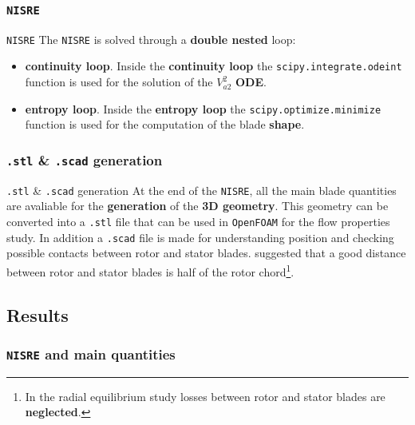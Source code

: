 \subsubsection{\texttt{NISRE}}
	\begin{frame}[fragile]{\texttt{NISRE}}
		The \texttt{NISRE} is solved through a \textbf{double nested} loop:
		\begin{itemize}
			\item \textbf{continuity loop}. Inside the \textbf{continuity loop} the \verb|scipy.integrate.odeint| function is used for the solution of the $V_{a2}^2$ \textbf{ODE}.
			\item \textbf{entropy loop}. Inside the \textbf{entropy loop} the \verb|scipy.optimize.minimize| function is used for the computation of the blade \textbf{shape}.
		\end{itemize}
	\end{frame}

\subsubsection{\texttt{.stl} \& \texttt{.scad} generation}
	\begin{frame}[fragile]{\texttt{.stl} \& \texttt{.scad} generation}
		At the end of the \verb|NISRE|, all the main blade quantities are avaliable for the \textbf{generation} of the \textbf{3D geometry}. This geometry can be converted into a \verb|.stl| file that can be used in \verb|OpenFOAM| for the flow properties study. In addition a \verb|.scad| file is made for understanding position and checking possible contacts between rotor and stator blades.	
		\newline
		\newline 
		\cite{baskharone2006principles} suggested that a good distance between rotor and stator blades is half of the rotor chord\footnote{In the radial equilibrium study losses between rotor \newline and stator blades are \textbf{neglected}.}.
	\end{frame}

\subsection{Results}
	\subsubsection{\texttt{NISRE} and main quantities}

